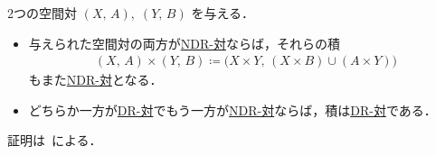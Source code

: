 \documentclass[algtopo_main]{subfiles}
\begin{document}
\begin{mylem}[label=lem:NDR]{}
    2つの空間対 $(X,\, A),\; (Y,\, B)$ を与える．
    \begin{itemize}
        \item 与えられた空間対の両方が\hyperref[def:NDR]{NDR-対}ならば，それらの積
        \begin{align}
            (X,\, A) \times (Y,\, B) \coloneqq \bigl( X \times Y,\, (X \times B) \cup (A \times Y) \bigr) 
        \end{align}
        もまた\hyperref[def:NDR]{NDR-対}となる．
        \item どちらか一方が\hyperref[def:NDR]{DR-対}でもう一方が\hyperref[def:NDR]{NDR-対}ならば，積は\hyperref[def:NDR]{DR-対}である．
    \end{itemize}
    
\end{mylem}
証明は~\cite[THEOREM 6.3.]{Steenrod67}による．
\end{document}
